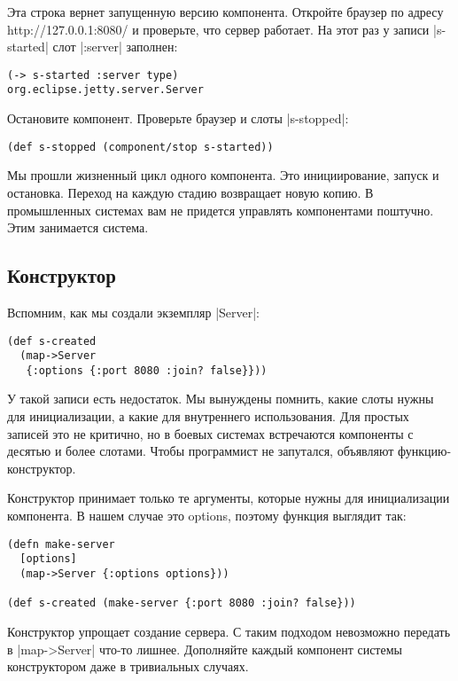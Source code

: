 Эта строка вернет запущенную версию компонента. Откройте браузер по адресу
http://127.0.0.1:8080/ и проверьте, что сервер работает. На этот раз у записи
\spverb|s-started| слот \spverb|:server| заполнен:

\begin{verbatim}
(-> s-started :server type)
org.eclipse.jetty.server.Server
\end{verbatim}

Остановите компонент. Проверьте браузер и слоты \spverb|s-stopped|:

\begin{verbatim}
(def s-stopped (component/stop s-started))
\end{verbatim}

Мы прошли жизненный цикл одного компонента. Это инициирование, запуск и
остановка. Переход на каждую стадию возвращает новую копию. В промышленных
системах вам не придется управлять компонентами поштучно. Этим занимается
система.

\subsection{Конструктор}

Вспомним, как мы создали экземпляр \spverb|Server|:

\begin{verbatim}
(def s-created
  (map->Server
   {:options {:port 8080 :join? false}}))
\end{verbatim}

У такой записи есть недостаток. Мы вынуждены помнить, какие слоты нужны для
инициализации, а какие для внутреннего использования. Для простых записей это не
критично, но в боевых системах встречаются компоненты с десятью и более
слотами. Чтобы программист не запутался, объявляют функцию-конструктор.

Конструктор принимает только те аргументы, которые нужны для инициализации
компонента. В нашем случае это options, поэтому функция выглядит так:

\begin{verbatim}
(defn make-server
  [options]
  (map->Server {:options options}))

(def s-created (make-server {:port 8080 :join? false}))
\end{verbatim}

Конструктор упрощает создание сервера. С таким подходом невозможно передать в
\spverb|map->Server| что-то лишнее. Дополняйте каждый компонент системы конструктором
даже в тривиальных случаях.

